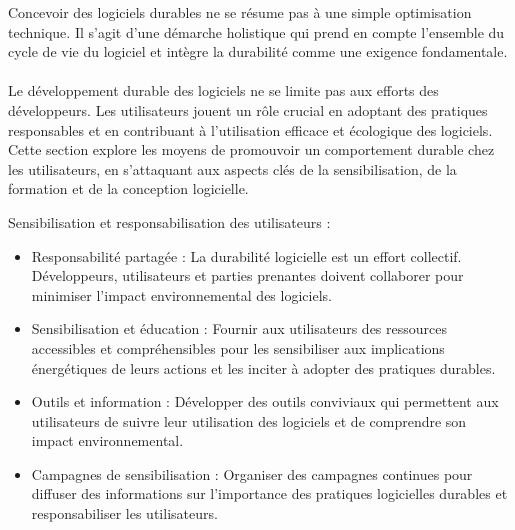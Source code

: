Concevoir des logiciels durables ne se résume pas à une simple optimisation technique. Il s'agit d'une démarche holistique qui prend en compte l'ensemble du cycle de vie du logiciel et intègre la durabilité comme une exigence fondamentale.


\paragraph{}
Le développement durable des logiciels ne se limite pas aux efforts des développeurs. Les utilisateurs jouent un rôle crucial en adoptant des pratiques responsables et en contribuant à l'utilisation efficace et écologique des logiciels. 
Cette section explore les moyens de promouvoir un comportement durable chez les utilisateurs, en s'attaquant aux aspects clés de la sensibilisation, de la formation et de la conception logicielle.


Sensibilisation et responsabilisation des utilisateurs :
\begin{itemize}
    \item Responsabilité partagée : La durabilité logicielle est un effort collectif. Développeurs, utilisateurs et parties prenantes doivent collaborer pour minimiser l'impact environnemental des logiciels.
    \item Sensibilisation et éducation : Fournir aux utilisateurs des ressources accessibles et compréhensibles pour les sensibiliser aux implications énergétiques de leurs actions et les inciter à adopter des pratiques durables.
    \item Outils et information : Développer des outils conviviaux qui permettent aux utilisateurs de suivre leur utilisation des logiciels et de comprendre son impact environnemental.
    \item Campagnes de sensibilisation : Organiser des campagnes continues pour diffuser des informations sur l'importance des pratiques logicielles durables et responsabiliser les utilisateurs.
\end{itemize}


